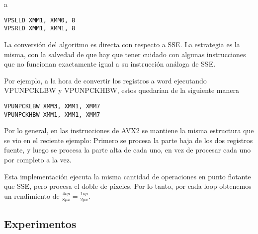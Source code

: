 a

\begin{lstlisting}
VPSLLD XMM1, XMM0, 8
VPSRLD XMM1, XMM1, 8
\end{lstlisting}


La conversión del algoritmo es directa con respecto a SSE. La estrategia es la misma, con la salvedad de que hay que tener cuidado con algunas instrucciones que no funcionan exactamente igual a su instrucción análoga de SSE.

Por ejemplo, a la hora de convertir los registros a word ejecutando VPUNPCKLBW y VPUNPCKHBW, estos quedarían de la siguiente manera

\begin{lstlisting}
VPUNPCKLBW XMM3, XMM1, XMM7
VPUNPCKHBW XMM1, XMM1, XMM7
\end{lstlisting}

 

 

Por lo general, en las instrucciones de AVX2 se mantiene la misma estructura que se vio en el reciente ejemplo: Primero se procesa la parte baja de los dos registros fuente, y luego se procesa la parte alta de cada uno, en vez de procesar cada uno por completo a la vez.

Esta implementación ejecuta la misma cantidad de operaciones en punto flotante que SSE, pero procesa el doble de píxeles. Por lo tanto, por cada loop obtenemos un rendimiento de $\frac{4op}{8px} = \frac{1op}{2px}$.


\subsection{Experimentos}

